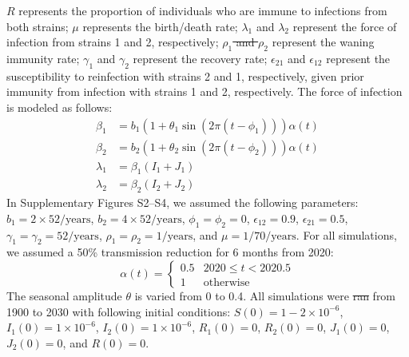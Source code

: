 \documentclass[12pt]{article}
\providecommand{\DIFaddtex}[1]{{\protect\color{blue}\uwave{#1}}} %
\providecommand{\DIFdeltex}[1]{{\protect\color{red}\sout{#1}}}                      %
\providecommand{\DIFaddbegin}{} %
\providecommand{\DIFaddend}{} %
\providecommand{\DIFdelbegin}{} %
\providecommand{\DIFdelend}{} %
\providecommand{\DIFadd}[1]{\texorpdfstring{\DIFaddtex{#1}}{#1}} %
\providecommand{\DIFdel}[1]{\texorpdfstring{\DIFdeltex{#1}}{}} %
\newcommand{\DIFscaledelfig}{0.5}
\newlength{\DIFdelgraphicswidth} %
\newlength{\DIFdelgraphicsheight} %
\newcommand{\DIFaddincludegraphics}[2][]{{\color{blue}\fbox{\DIFOincludegraphics[#1]{#2}}}} %
\newcommand{\DIFdelincludegraphics}[2][]{%
\sbox{\DIFdelgraphicsbox}{\DIFOincludegraphics[#1]{#2}}%
\settoboxwidth{\DIFdelgraphicswidth}{\DIFdelgraphicsbox} %
\settoboxtotalheight{\DIFdelgraphicsheight}{\DIFdelgraphicsbox} %
\scalebox{\DIFscaledelfig}{%
\parbox[b]{\DIFdelgraphicswidth}{\usebox{\DIFdelgraphicsbox}\\[-\baselineskip] \rule{\DIFdelgraphicswidth}{0em}}\llap{\resizebox{\DIFdelgraphicswidth}{\DIFdelgraphicsheight}{%
\setlength{\unitlength}{\DIFdelgraphicswidth}%
\begin{picture}(1,1)%
\thicklines\linethickness{2pt} %
{\color[rgb]{1,0,0}\put(0,0){\framebox(1,1){}}}%
{\color[rgb]{1,0,0}\put(0,0){\line( 1,1){1}}}%
{\color[rgb]{1,0,0}\put(0,1){\line(1,-1){1}}}%
\end{picture}%
}\hspace*{3pt}}} %
} %
\DeclareRobustCommand{\DIFaddbegin}{\DIFOaddbegin \let\includegraphics\DIFaddincludegraphics} %
\DeclareRobustCommand{\DIFaddend}{\DIFOaddend \let\includegraphics\DIFOincludegraphics} %
\DeclareRobustCommand{\DIFdelbegin}{\DIFOdelbegin \let\includegraphics\DIFdelincludegraphics} %
\DeclareRobustCommand{\DIFdelend}{\DIFOaddend \let\includegraphics\DIFOincludegraphics} %
\begin{document}
$R$ represents the proportion of individuals who are immune to infections from both strains;
$\mu$ represents the birth/death rate;
$\lambda_1$ and $\lambda_2$ represent the force of infection from strains 1 and 2, respectively;
\DIFdelbegin \DIFdel{$\rho_1$ and $\rho_2$ }\DIFdelend \DIFaddbegin \DIFadd{$\delta_1$ and $\delta_2$ }\DIFaddend represent the waning immunity rate;
$\gamma_1$ and $\gamma_2$ represent the recovery rate;
$\epsilon_{21}$ and $\epsilon_{12}$ represent the susceptibility to reinfection with strains 2 and 1, respectively, given prior immunity from infection with strains 1 and 2, respectively. 
The force of infection is modeled as follows:
\begin{align}
\beta_1 &= b_1 (1 + \theta_1 \sin(2 \pi (t-\phi_1))) \alpha(t)\\
\beta_2 &= b_2 (1 + \theta_2 \sin(2 \pi (t-\phi_2))) \alpha(t)\\
\lambda_1 &= \beta_1 (I_1 + J_1)\\
\lambda_2 &= \beta_2 (I_2 + J_2)
\end{align}
In Supplementary Figures S2--S4, we assumed the following parameters:
$b_1 = 2 \times 52/\mathrm{years}$, $b_2 = 4 \times 52/\mathrm{years}$, $\phi_1 = \phi_2 = 0$, $\epsilon_{12} = 0.9$, $\epsilon_{21} = 0.5$,
$\gamma_1 = \gamma_2 = 52/\mathrm{years}$, \DIFdelbegin \DIFdel{$\rho_1 = \rho_2 = 1/\mathrm{years}$}\DIFdelend \DIFaddbegin \DIFadd{$\delta_1 = \delta_2 = 1/\mathrm{years}$}\DIFaddend , and $\mu=1/70/\mathrm{years}$.
For all simulations, we assumed a 50\% transmission reduction for 6 months from 2020:
\begin{equation}
\alpha(t) = \begin{cases}
0.5 & 2020 \leq t< 2020.5\\
1 & \textrm{otherwise}
\end{cases}
\end{equation}
The seasonal amplitude $\theta$ is varied from 0 to 0.4.
All simulations were \DIFdelbegin \DIFdel{ran }\DIFdelend \DIFaddbegin \DIFadd{run }\DIFaddend from 1900 to 2030 with following initial conditions: 
$S(0) = 1 - 2\times 10^{-6}$, $I_1(0) = 1 \times 10^{-6}$, $I_2(0) = 1 \times 10^{-6}$, $R_1(0) = 0$, $R_2(0) = 0$, $J_1(0) = 0$, $J_2(0) = 0$, and $R(0) = 0$.
\end{document}

